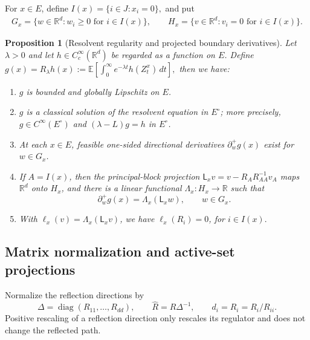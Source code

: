 \documentclass[aihp]{imsart}
\numberwithin{equation}{section}
\theoremstyle{plain}
\newtheorem{proposition}[proposition]{Proposition}
\theoremstyle{definition}
\newcommand{\R}{\mathbb R}
\newcommand{\diag}{\operatorname{diag}}
\newcommand{\1}{\mathbf 1}
\begin{document}
For $x\in E$, define $I(x)=\{i\in J:x_i=0\},$ and put
\begin{align}
 G_x=\{w\in\R^d:w_i\ge0\text{ for }i\in I(x)\}, \qquad
 H_x=\{v\in\R^d:v_i=0\text{ for }i\in I(x)\}.
\end{align}

\begin{proposition}[Resolvent regularity and projected boundary derivatives]\label{prop:resolvent-regularity-projected}
Let $\lambda>0$ and let $h\in C_c^\infty(\mathbb R^d)$ be regarded as a function on $E$. Define $g(x)=R_\lambda h(x)
 :=\mathbb E\left[\int_0^\infty e^{-\lambda t}h(Z_t^x)\,dt\right],$ then we have:
\begin{enumerate}[label=\textup{(\roman*)}]
\item $g$ is bounded and globally Lipschitz on $E$.
\item $g$ is a classical solution of the resolvent equation in $E^\circ$; more precisely, $g\in C^\infty(E^\circ)$ and $ (\lambda-L)g=h$ in $E^\circ$.
\item At each $x\in E$, feasible one-sided directional derivatives $\partial_w^+g(x)$ exist for $w\in G_x$.
\item If $A=I(x)$, then the principal-block projection
\(
 \mathsf L_xv=v-R_A R_{AA}^{-1}v_A
\)
maps $\mathbb R^d$ onto $H_x$, and there is a linear functional $\Lambda_x:H_x\to\mathbb R$ such that
\[
 \partial_w^+g(x)=\Lambda_x(\mathsf L_xw),
 \qquad w\in G_x.
\]
\item With $\ell_x(v)=\Lambda_x(\mathsf L_xv)$, we have  $\ell_x(R_i)=0$, for $i\in I(x).$
\end{enumerate}
\end{proposition}

\subsection{Matrix normalization and active-set projections}

Normalize the reflection directions by
\[
 \Delta=\diag(R_{11},\ldots,R_{dd}),
 \qquad
 \widehat R=R\Delta^{-1},
 \qquad
 d_i=\widehat R_i=R_i/R_{ii}.
\]
Positive rescaling of a reflection direction only rescales its regulator and does not change the reflected path.
\end{document}
